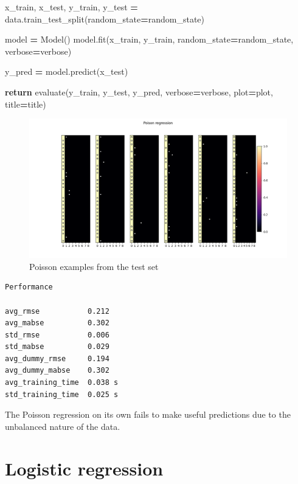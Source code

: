 \documentclass[
]{article}
\newenvironment{Shaded}{\begin{snugshade}}{\end{snugshade}}
\newcommand{\ControlFlowTok}[1]{\textcolor[rgb]{0.13,0.29,0.53}{\textbf{#1}}}
\newcommand{\NormalTok}[1]{#1}
\newcommand{\OperatorTok}[1]{\textcolor[rgb]{0.81,0.36,0.00}{\textbf{#1}}}
\begin{document}
\begin{Shaded}
\begin{Highlighting}[]
\NormalTok{    x\_train, x\_test, y\_train, y\_test }\OperatorTok{=}\NormalTok{ data.train\_test\_split(random\_state}\OperatorTok{=}\NormalTok{random\_state)}

\NormalTok{    model }\OperatorTok{=}\NormalTok{ Model()}
\NormalTok{    model.fit(x\_train, y\_train, random\_state}\OperatorTok{=}\NormalTok{random\_state, verbose}\OperatorTok{=}\NormalTok{verbose)}

\NormalTok{    y\_pred }\OperatorTok{=}\NormalTok{ model.predict(x\_test)}

    \ControlFlowTok{return}\NormalTok{ evaluate(y\_train, y\_test, y\_pred, }
\NormalTok{                    verbose}\OperatorTok{=}\NormalTok{verbose, plot}\OperatorTok{=}\NormalTok{plot, title}\OperatorTok{=}\NormalTok{title)}
\end{Highlighting}
\end{Shaded}

\begin{figure}
\centering
\includegraphics{figures/poisson_regression.png}
\caption{Poisson examples from the test set}
\end{figure}

\begin{verbatim}
Performance

avg_rmse           0.212
avg_mabse          0.302
std_rmse           0.006
std_mabse          0.029
avg_dummy_rmse     0.194
avg_dummy_mabse    0.302
avg_training_time  0.038 s
std_training_time  0.025 s
\end{verbatim}

The Poisson regression on its own fails to make useful predictions due
to the unbalanced nature of the data.

\section{Logistic regression}\label{logistic-regression}
\end{document}
